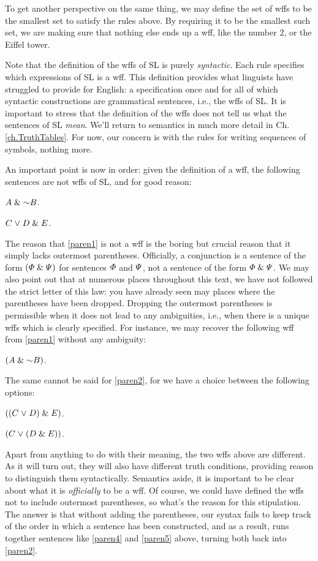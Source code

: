 To get another perspective on the same thing, we may define the set of wffs to be the smallest set to satisfy the rules above.
By requiring it to be the smallest such set, we are making sure that nothing else ends up a wff, like the number 2, or the Eiffel tower. 

Note that the definition of the wffs of SL is purely \emph{syntactic}.
Each rule specifies which expressions of SL is a wff.
This definition provides what linguists have struggled to provide for English: a specification once and for all of which syntactic constructions are grammatical sentences, i.e., the wffs of SL.
It is important to stress that the definition of the wffs does not tell us what the sentences of SL \emph{mean}.
We'll return to semantics in much more detail in Ch. \ref{ch.TruthTables}.
For now, our concern is with the rules for writing sequences of symbols, nothing more.

An important point is now in order: given the definition of a wff, the following sentences are not wffs of SL, and for good reason:
\begin{earg}
  \item[\ex{paren1}] $A \eand \enot B$.
  \item[\ex{paren2}] $C \mkern1mu\vee\mkern1mu D \mathrel\& E$.
\end{earg}
The reason that \ref{paren1} is not a wff is the boring but crucial reason that it simply lacks outermost parentheses.
Officially, a conjunction is a sentence of the form $(\varPhi{} \mathrel\& \varPsi{})$ for sentences $\varPhi{}$ and $\varPsi{}$, not a sentence of the form $\varPhi{} \mathrel\& \varPsi{}$.
We may also point out that at numerous places throughout this text, we have not followed the strict letter of this law: you have already seen may places where the parentheses have been dropped.
Dropping the outermost parentheses is permissible when it does not lead to any ambiguities, i.e., when there is a unique wffs which is clearly specified.
For instance, we may recover the following wff from \ref{paren1} without any ambiguity:
\begin{earg}
  \item[\ex{paren3}] $(A \eand \enot B)$.
\end{earg}
The same cannot be said for \ref{paren2}, for we have a choice between the following options:
\begin{earg}
  \item[\ex{paren4}] $((C \mkern1mu\vee\mkern1mu D) \mathrel\& E)$.
  \item[\ex{paren5}] $(C \mkern1mu\vee\mkern1mu (D \mathrel\& E))$.
\end{earg}
Apart from anything to do with their meaning, the two wffs above are different.
As it will turn out, they will also have different truth conditions, providing reason to distinguish them syntactically.
Semantics aside, it is important to be clear about what it is \textit{officially} to be a wff.
Of course, we could have defined the wffs not to include outermost parentheses, so what's the reason for this stipulation.
The answer is that without adding the parentheses, our syntax fails to keep track of the order in which a sentence has been constructed, and as a result, runs together sentences like \ref{paren4} and \ref{paren5} above, turning both back into \ref{paren2}.


